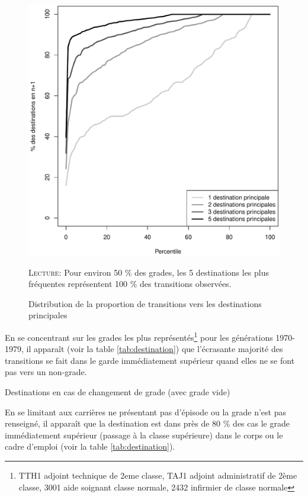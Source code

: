 \documentclass[11pt,a4paper]{article}
\begin{document}
\begin{figure}[t]
  \label{pct}
\caption{Distribution de la proportion de transitions vers les destinations principales}
\vspace{-0.1cm}
\centering
 \includegraphics[width=0.7\linewidth]{pct.pdf}
\vspace{0.1cm}  
\begin{minipage}{12cm}%
\small \textsc{Lecture:} Pour environ 50 \% des grades, les 5 destinations les plus fréquentes représentent 100 \% des transitions observées.  
 \end{minipage}%
\end{figure}

En se concentrant sur les grades les plus représentés\footnote{TTH1 adjoint technique de 2eme classe, TAJ1 adjoint administratif de 2ème classe, 3001 aide soignant classe normale, 2432 infirmier de classe normale}
pour les générations 1970-1979, il apparaît (voir la table \ref{tab:destination}) que l'écrasante majorité des transitions se fait dans le garde immédiatement supérieur quand elles ne se font pas vers un non-grade.
\begin{table}[htbp]
    \label{tab:destination}
    \centering
    \caption{Destinations en cas de changement de grade (avec grade vide)} 
    
\end{table}

En se limitant aux carrières ne présentant pas d'épisode ou la grade n'est pas renseigné, il apparaît que la destination est dans près de 80 \% des cas le grade immédiatement supérieur (passage à la classe supérieure) dans le corps ou le cadre d'emploi (voir la table \ref{tab:destination}).       
\end{document}
